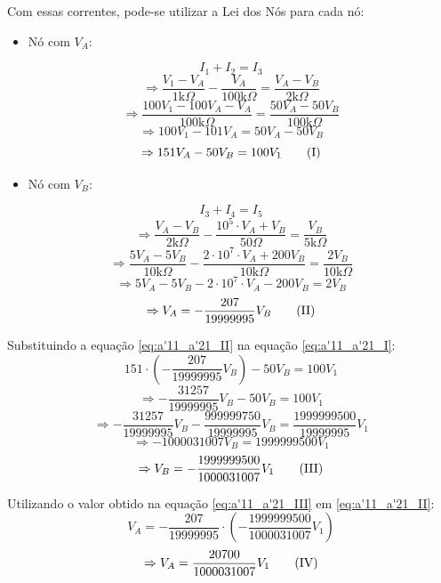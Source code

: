 \documentclass{report}
\begin{document}
Com essas correntes, pode-se utilizar a Lei dos Nós para cada nó:

\begin{itemize}
  \item Nó com $ V_A $:
\end{itemize}
$$ I_1 + I_2 = I_3 $$
$$ \Rightarrow \frac{V_1 - V_A}{1 \text{k}\Omega} - \frac{V_A}{100 \text{k}\Omega}  = \frac{V_A - V_B}{2 \text{k}\Omega} $$
$$ \Rightarrow \frac{100V_1 - 100V_A - V_A}{100 \text{k}\Omega} = \frac{50V_A - 50V_B}{100 \text{k}\Omega} $$
$$ \Rightarrow 100V_1 - 101V_A = 50V_A - 50V_B $$
\begin{equation}
  \label{eq:a'11_a'21_I}
  \centering
  \Rightarrow 151V_A - 50V_B = 100V_1 \tag{I}
\end{equation}

\begin{itemize}
  \item Nó com $ V_B $:
\end{itemize}
$$ I_3 + I_4 = I_5 $$
$$ \Rightarrow \frac{V_A - V_B}{2 \text{k}\Omega} - \frac{10^5 \cdot V_A + V_B}{50\Omega} = \frac{V_B}{5 \text{k}\Omega} $$
$$ \Rightarrow \frac{5V_A - 5V_B}{10 \text{k}\Omega} - \frac{2 \cdot 10^7 \cdot V_A + 200V_B}{10\text{k}\Omega} = \frac{2V_B}{10 \text{k}\Omega} $$
$$ \Rightarrow 5V_A - 5V_B - 2 \cdot 10^7 \cdot V_A - 200V_B = 2V_B $$
\begin{equation}
  \label{eq:a'11_a'21_II}
  \centering
  \Rightarrow V_A = - \frac{207}{19999995}V_B \tag{II}
\end{equation}

Substituindo a equação \ref{eq:a'11_a'21_II} na equação \ref{eq:a'11_a'21_I}:
$$ 151 \cdot \left(- \frac{207}{19999995}V_B \right) - 50V_B = 100V_1 $$
$$ \Rightarrow - \frac{31257}{19999995}V_B - 50V_B = 100V_1 $$
$$ \Rightarrow - \frac{31257}{19999995}V_B - \frac{999999750}{19999995}V_B = \frac{1999999500}{19999995}V_1 $$
$$ \Rightarrow - 1000031007V_B = 1999999500V_1 $$
\begin{equation}
  \label{eq:a'11_a'21_III}
  \centering
  \Rightarrow V_B = - \frac{1999999500}{1000031007}V_1 \tag{III}
\end{equation}

Utilizando o valor obtido na equação \ref{eq:a'11_a'21_III} em \ref{eq:a'11_a'21_II}:
$$ V_A = - \frac{207}{19999995} \cdot \left( - \frac{1999999500}{1000031007}V_1 \right) $$
\begin{equation}
  \label{eq:a'11_a'21_IV}
  \centering
  \Rightarrow V_A = \frac{20700}{1000031007}V_1 \tag{IV}
\end{equation}
\end{document}
